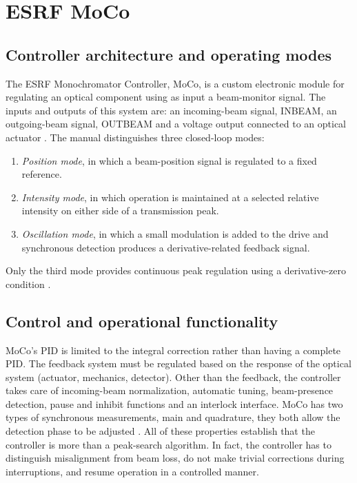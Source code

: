 \section{ESRF MoCo}

\subsection{Controller architecture and operating modes}

The ESRF Monochromator Controller, MoCo, is a custom electronic module for regulating an optical component using as input a beam-monitor signal. 
The inputs and outputs of this system are: an incoming-beam signal, INBEAM, an outgoing-beam signal, OUTBEAM and a voltage output connected to an optical actuator \cite{MoCo2008}.
The manual distinguishes three closed-loop modes:

\begin{enumerate}
    \item \emph{Position mode}, in which a beam-position signal is regulated to a fixed reference.
    \item \emph{Intensity mode}, in which operation is maintained
    at a selected relative intensity on either side of a
    transmission peak.
    \item \emph{Oscillation mode}, in which a small modulation
    is added to the drive and synchronous detection produces
    a derivative-related feedback signal.
\end{enumerate}

Only the third mode provides continuous peak regulation using
a derivative-zero condition \cite{MoCo2008}.

\subsection{Control and operational functionality}

MoCo's PID is limited to the integral correction rather than having a complete PID.
The feedback system must be regulated based on the response of the optical system (actuator, mechanics, detector).
Other than the feedback, the controller takes care of incoming-beam normalization, automatic tuning, beam-presence detection, pause and inhibit functions and an interlock interface.
MoCo has two types of synchronous measurements, main and quadrature, they both allow the detection phase to be adjusted \cite{MoCo2008}.
All of these properties establish that the controller is more than a peak-search algorithm.
In fact, the controller has to distinguish misalignment from beam loss, do not make trivial corrections during interruptions, and resume operation in a controlled manner.

